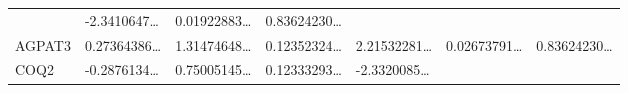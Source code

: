 \documentclass[
]{article}
\begin{document}
\begin{longtable}[]{@{}lllllll@{}}
\begin{minipage}[t]{0.12\columnwidth}
\end{minipage} & \begin{minipage}[t]{0.12\columnwidth}\raggedright
-2.3410647\ldots{}\strut
\end{minipage} & \begin{minipage}[t]{0.12\columnwidth}\raggedright
0.01922883\ldots{}\strut
\end{minipage} & \begin{minipage}[t]{0.12\columnwidth}\raggedright
0.83624230\ldots{}\strut
\end{minipage}\tabularnewline
\begin{minipage}[t]{0.08\columnwidth}\raggedright
AGPAT3\strut
\end{minipage} & \begin{minipage}[t]{0.12\columnwidth}\raggedright
0.27364386\ldots{}\strut
\end{minipage} & \begin{minipage}[t]{0.12\columnwidth}\raggedright
1.31474648\ldots{}\strut
\end{minipage} & \begin{minipage}[t]{0.12\columnwidth}\raggedright
0.12352324\ldots{}\strut
\end{minipage} & \begin{minipage}[t]{0.12\columnwidth}\raggedright
2.21532281\ldots{}\strut
\end{minipage} & \begin{minipage}[t]{0.12\columnwidth}\raggedright
0.02673791\ldots{}\strut
\end{minipage} & \begin{minipage}[t]{0.12\columnwidth}\raggedright
0.83624230\ldots{}\strut
\end{minipage}\tabularnewline
\begin{minipage}[t]{0.08\columnwidth}\raggedright
COQ2\strut
\end{minipage} & \begin{minipage}[t]{0.12\columnwidth}\raggedright
-0.2876134\ldots{}\strut
\end{minipage} & \begin{minipage}[t]{0.12\columnwidth}\raggedright
0.75005145\ldots{}\strut
\end{minipage} & \begin{minipage}[t]{0.12\columnwidth}\raggedright
0.12333293\ldots{}\strut
\end{minipage} & \begin{minipage}[t]{0.12\columnwidth}\raggedright
-2.3320085\ldots{}\strut
\end{minipage} & \begin{minipage}[t]{0.12\columnwidth}\raggedright

\end{minipage}
\end{longtable}
\end{document}
